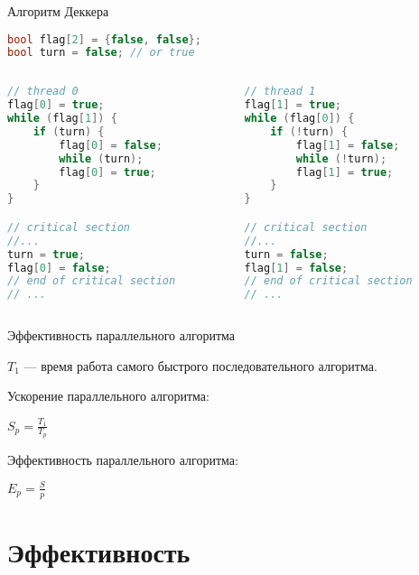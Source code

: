\begin{frame}[fragile]{Алгоритм Деккера}

\begin{lstlisting}[language=C++,basicstyle=\ttfamily,keywordstyle=\color{blue},basicstyle=\scriptsize]
bool flag[2] = {false, false};
bool turn = false; // or true
\end{lstlisting}

\begin{columns}[t]
    \begin{column}[T]{0.45\textwidth}
        \begin{lstlisting}[language=C++,basicstyle=\ttfamily,keywordstyle=\color{blue},basicstyle=\scriptsize]
// thread 0
flag[0] = true;
while (flag[1]) {
    if (turn) {
        flag[0] = false;
        while (turn);
        flag[0] = true;
    }
}

// critical section
//...
turn = true;
flag[0] = false;
// end of critical section
// ...
        \end{lstlisting}
    \end{column}
    \begin{column}[T]{0.45\textwidth}
        \begin{lstlisting}[language=C++,basicstyle=\ttfamily,keywordstyle=\color{blue},basicstyle=\scriptsize]
// thread 1
flag[1] = true;
while (flag[0]) {
    if (!turn) {
        flag[1] = false;
        while (!turn);
        flag[1] = true;
    }
}

// critical section
//...
turn = false;
flag[1] = false;
// end of critical section
// ...
        \end{lstlisting}
    \end{column}
\end{columns}

\end{frame}

\begin{frame}{Эффективность параллельного алгоритма}

$T_1$ --- время работа самого быстрого последовательного алгоритма.

Ускорение параллельного алгоритма:

$S_p = \frac{T_1}{T_p}$

Эффективность параллельного алгоритма:

$E_p = \frac{S}{p}$

\end{frame}

\section{Эффективность}

